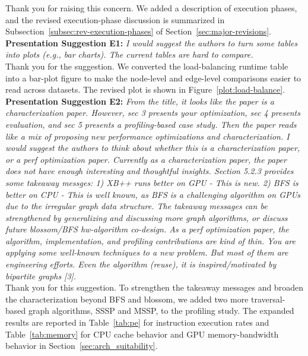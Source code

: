 \noindent Thank you for raising this concern. We added a description of execution phases, and the revised execution-phase discussion is summarized in Subsection~\ref{subsec:rev-execution-phases} of Section~\ref{sec:major-revisions}.
\\

\noindent\textbf{Presentation Suggestion E1:} \textit{I would suggest the authors to turn some tables into plots (e.g., bar charts). The current tables are hard to compare.}
\\

\noindent Thank you for the suggestion. We converted the load-balancing runtime table into a bar-plot figure to make the node-level and edge-level comparisons easier to read across datasets. The revised plot is shown in Figure~\ref{plot:load-balance}.
\\

\noindent\textbf{Presentation Suggestion E2:} \textit{From the title, it looks like the paper is a characterization paper. However, sec 3 presents your optimization, sec 4 presents evaluation, and sec 5 presents a profiling-based case study. Then the paper reads like a mix of proposing new performance optimizations and characterization. I would suggest the authors to think about whether this is a characterization paper, or a perf optimization paper.
Currently as a characterization paper, the paper does not have enough interesting and thoughtful insights. Section 5.2.3 provides some takeaway messges: 1) XB++ runs better on GPU - This is new. 2) BFS is better on CPU - This is well known, as BFS is a challenging algorithm on GPUs due to the irregular graph data structure. The takeaway messages can be strengthened by generalizing and discussing more graph algorithms, or discuss future blossom/BFS hw-algorithm co-design.
As a perf optimization paper, the algorithm, implementation, and profiling contributions are kind of thin. You are applying some well-known techniques to a new problem. But most of them are engineering efforts. Even the algorithm (reuse), it is inspired/motivated by bipartite graphs [3].}
\\

\noindent Thank you for this suggestion. To strengthen the takeaway messages and broaden the characterization beyond BFS and blossom, we added two more traversal-based graph algorithms, SSSP and MSSP, to the profiling study. The expanded results are reported in Table~\ref{tab:pe} for instruction execution rates and Table~\ref{tab:memory} for CPU cache behavior and GPU memory-bandwidth behavior in Section~\ref{sec:arch_suitability}.
\\
